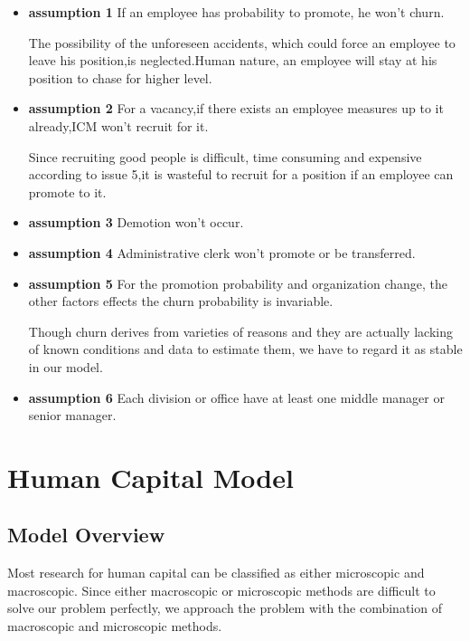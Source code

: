 \documentclass[12pt,a4paper,titlepage]{article}
\begin{document}
\begin{itemize}
\item \textbf{assumption 1} If an employee has probability to
  promote, he won't churn.

The possibility of the unforeseen accidents, which could force an
employee to leave his position,is neglected.Human nature, an employee
will stay at his position to chase for higher level.

\item \textbf{assumption 2} For a vacancy,if there exists an
  employee measures up to it already,ICM won't recruit for it.

Since recruiting good people is difficult, time consuming and
expensive according to issue 5,it is wasteful to recruit for a
position if an employee can promote to it.

\item \textbf{assumption 3} Demotion won't occur.

\item \textbf{assumption 4} Administrative clerk won't promote or be
  transferred.

\item \textbf{assumption 5} For the promotion probability and
  organization change, the other factors effects the churn probability
  is invariable.

Though churn derives from varieties of reasons and they are actually
lacking of known conditions and data to estimate them, we have to
regard it as stable in our model.

\item \textbf{assumption 6} Each division or office have at least one
  middle manager or senior manager.

\end{itemize}

\section{Human Capital Model}
\label{sec:human-capital-model}

\subsection{Model Overview}
\label{sec:model-overview}

Most research for human capital can be classified as either
microscopic and macroscopic. Since either macroscopic or microscopic
methods are difficult to solve our problem perfectly, we approach the
problem with the combination of macroscopic and microscopic methods.
\end{document}
